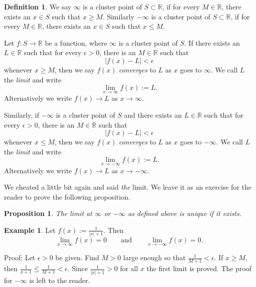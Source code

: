 \documentclass[12pt]{book}
\newcommand{\abs}[1]{\left\lvert {#1} \right\rvert}
\newcommand{\R}{{\mathbb{R}}}
\newcommand{\myindex}[1]{#1\index{#1}}
\theoremstyle{plain}
\newtheorem{prop}[thm]{Proposition}
\theoremstyle{remark}
\theoremstyle{definition}
\newtheorem{defn}[thm]{Definition}
\theoremstyle{exercise}
\theoremstyle{example}
\newtheorem{example}[thm]{Example}
\begin{document}
\begin{defn}
We say $\infty$ is a cluster point of $S \subset \R$, if for every
$M \in \R$, there exists an $x \in S$ such that $x \geq M$.  Similarly
$- \infty$ is a cluster point of $S \subset \R$, if for every
$M \in \R$, there exists an $x \in S$ such that $x \leq M$.

%
Let $f \colon S \to \R$ be a function, where 
$\infty$ is a cluster point of $S$.
If there exists an $L \in \R$
such that for every $\epsilon > 0$, there is an $M \in \R$ such that
\begin{equation*}
\abs{f(x) - L} < \epsilon 
\end{equation*}
whenever $x \geq M$, then we say $f(x)$ \emph{\myindex{converges}} to $L$
as $x$ goes to $\infty$.  We call $L$ the \emph{\myindex{limit}} and write
\begin{equation*}
\lim_{x \to \infty} f(x) := L .
\end{equation*}
Alternatively we write $f(x) \to L$ as $x \to \infty$.

Similarly, if $-\infty$ is a cluster point of $S$
and
there exists an $L \in \R$
such that for every $\epsilon > 0$, there is an $M \in \R$ such that
\begin{equation*}
\abs{f(x) - L} < \epsilon 
\end{equation*}
whenever $x \leq M$, then we say $f(x)$ \emph{converges} to $L$
as $x$ goes to $-\infty$.  We call $L$ the \emph{limit} and write
\begin{equation*}
\lim_{x \to -\infty} f(x) := L .
\end{equation*}
Alternatively we write $f(x) \to L$ as $x \to -\infty$.
\end{defn}

We cheated a little bit again and said \emph{the} limit.
We leave it as an exercise for the reader to prove the following proposition.

\begin{prop} \label{liminfty:unique}
The limit at $\infty$ or $-\infty$ as defined above is unique if it exists.
\end{prop}

\begin{example}
Let $f(x) := \frac{1}{\abs{x}+1}$.  Then
\begin{equation*}
\lim_{x\to \infty} f(x) = 0 \qquad \text{and} \qquad
\lim_{x\to -\infty} f(x) = 0 .
\end{equation*}

Proof:
Let $\epsilon > 0$ be given.  Find $M > 0$ large enough
so that $\frac{1}{M+1} < \epsilon$.  If
$x \geq M$, then $\frac{1}{x+1} \leq \frac{1}{M+1} < \epsilon$.
Since $\frac{1}{\abs{x}+1} > 0$ for all $x$ the first limit is proved.
The proof for $-\infty$ is left to the reader.
\end{example}
\end{document}
